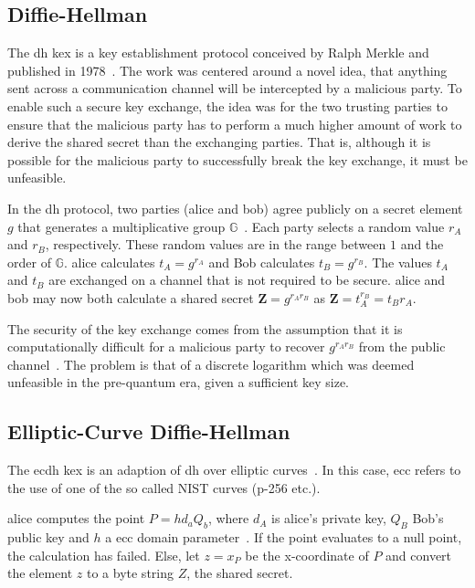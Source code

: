 \subsection{Diffie-Hellman}
\label{section:background:diffie-hellman}

The \gls{dh} \gls{kex} is a key establishment protocol conceived by Ralph Merkle and published in 1978~\cite{merkle1978}. The work was centered around a novel idea, that anything sent across a communication channel will be intercepted by a malicious party. To enable such a secure key exchange, the idea was for the two trusting parties to ensure that the malicious party has to perform a much higher amount of work to derive the shared secret than the exchanging parties. That is, although it is possible for the malicious party to successfully break the key exchange, it must be unfeasible.

In the \gls{dh} protocol, two parties (\gls{alice} and \gls{bob}) agree publicly on a secret element $g$ that generates a multiplicative group $\mathbb{G}$~\cite{merkle1978, boyd2020}. Each party selects a random value $r_A$ and $r_B$, respectively. These random values are in the range between $1$ and the order of $\mathbb{G}$. \gls{alice} calculates $t_A=g^{r_A}$ and Bob calculates $t_B=g^{r_B}$. The values $t_A$ and $t_B$ are exchanged on a channel that is not required to be secure. \gls{alice} and \gls{bob} may now both calculate a shared secret $\mathbf{Z}=g^{r_A r_B}$ as $\mathbf{Z}=t_A^{r_B}=t_B{r_A}$.

The security of the key exchange comes from the assumption that it is computationally difficult for a malicious party to recover $g^{r_A r_B}$ from the public channel~\cite{boyd2020}. The problem is that of a discrete logarithm which was deemed unfeasible in the pre-quantum era, given a sufficient key size.

\subsection{Elliptic-Curve Diffie-Hellman}

The \gls{ecdh} \gls{kex} is an adaption of \gls{dh} over elliptic curves~\cite{nist2018}. In this case, \gls{ecc} refers to the use of one of the so called NIST curves (\gls{p-256} etc.).

\gls{alice} computes the point $P=hd_aQ_b$, where $d_A$ is \gls{alice}'s private key, $Q_B$ Bob's public key and $h$ a \gls{ecc} domain parameter~\cite{nist2018}. If the point evaluates to a null point, the calculation has failed. Else, let $z=x_P$ be the x-coordinate of $P$ and convert the element $z$ to a byte string $Z$, the shared secret.

